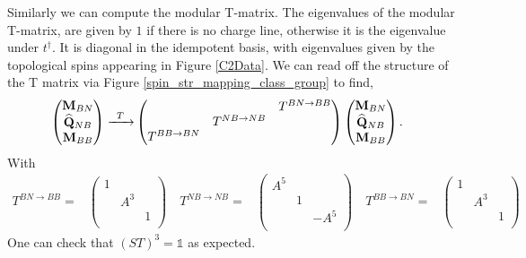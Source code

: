 \documentclass[12pt,a4paper]{article}
\newcounter{arrow}
\newcommand{\unit}{\mathds{1}}
\begin{document}
Similarly we can compute the modular T-matrix. 
The eigenvalues of the modular T-matrix, are given by $1$ if there is no charge line, otherwise it is the eigenvalue under $t^\dagger$.
It is diagonal in the idempotent basis, with eigenvalues given by the topological spins appearing in Figure \ref{C2Data}. 
We can read off the structure of the T matrix via Figure \ref{spin_str_mapping_class_group} to find,
\begin{align}
\left( \begin{matrix}
{\bf M}_{BN}\\
\widehat{{\bf Q} }_{NB}\\
{\bf M}_{BB}\\
\end{matrix} \right)
\xrightarrow{\;\; T \; \; } & \left( \begin{matrix}
&&T^{BN \rightarrow BB}\\
&T^{NB \rightarrow NB}&\\
T^{BB \rightarrow BN}&&\\
\end{matrix} \right)
\left( \begin{matrix}
{\bf M}_{BN}\\
\widehat{{\bf Q} }_{NB}\\
{\bf M}_{BB}\\
\end{matrix} \right).
\end{align}
With 
\begin{align}
T^{BN \rightarrow BB} =  & \left( \begin{matrix}
1&&\\
&A^3&\\
&&1\\
\end{matrix} \right)
\quad 
T^{NB \rightarrow NB}=  & \left( \begin{matrix}
A^5&&\\
&1&\\
&&-A^5\\
\end{matrix} \right)
\quad 
T^{BB \rightarrow BN}=  & \left( \begin{matrix}
1&&\\
&A^3&\\
&&1\\
\end{matrix} \right)
\end{align}
One can check that $(ST)^3 = \unit$ as expected. 
\end{document}
